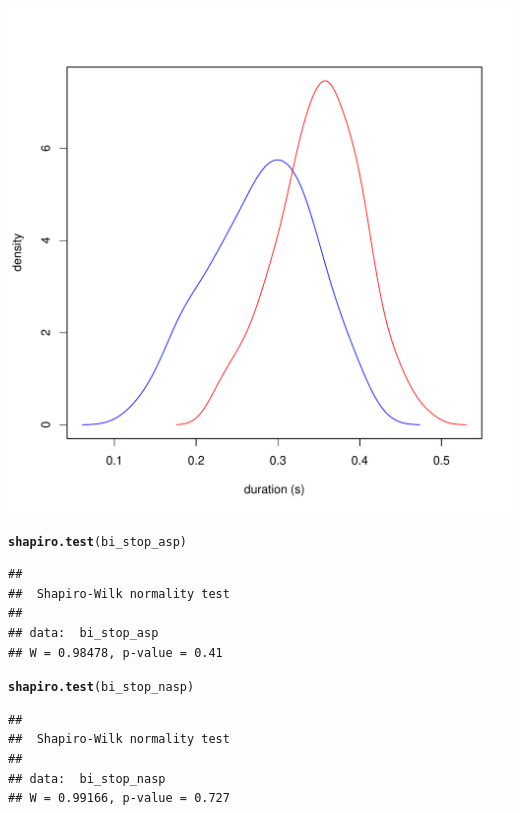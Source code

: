 \documentclass[a4paper,11pt]{article}\usepackage[]{graphicx}\usepackage[]{color}
\makeatletter
\def\maxwidth{ %
  \ifdim\Gin@nat@width>\linewidth
    \linewidth
  \else
    \Gin@nat@width
  \fi
}
\newcommand{\hlstd}[1]{\textcolor[rgb]{0.345,0.345,0.345}{#1}}%
\newcommand{\hlkwd}[1]{\textcolor[rgb]{0.737,0.353,0.396}{\textbf{#1}}}%
\newenvironment{kframe}{%
 \def\at@end@of@kframe{}%
 \ifinner\ifhmode%
  \def\at@end@of@kframe{\end{minipage}}%
  \begin{minipage}{\columnwidth}%
 \fi\fi%
 \def\FrameCommand##1{\hskip\@totalleftmargin \hskip-\fboxsep
 \colorbox{shadecolor}{##1}\hskip-\fboxsep
     \hskip-\linewidth \hskip-\@totalleftmargin \hskip\columnwidth}%
 \MakeFramed {\advance\hsize-\width
   \@totalleftmargin\z@ \linewidth\hsize
   \@setminipage}}%
 {\par\unskip\endMakeFramed%
 \at@end@of@kframe}
\newenvironment{knitrout}{}{} %
\makeatother
\begin{document}
\begin{knitrout}
{\centering \includegraphics[width=\maxwidth]{img/bi-stop-dens-1} 

}



\end{knitrout}

\begin{knitrout}
\color{fgcolor}\begin{kframe}
\begin{alltt}
\hlkwd{shapiro.test}\hlstd{(bi_stop_asp)}
\end{alltt}
\begin{verbatim}
## 
## 	Shapiro-Wilk normality test
## 
## data:  bi_stop_asp
## W = 0.98478, p-value = 0.41
\end{verbatim}
\begin{alltt}
\hlkwd{shapiro.test}\hlstd{(bi_stop_nasp)}
\end{alltt}
\begin{verbatim}
## 
## 	Shapiro-Wilk normality test
## 
## data:  bi_stop_nasp
## W = 0.99166, p-value = 0.727
\end{verbatim}
\end{kframe}
\end{knitrout}
\end{document}
